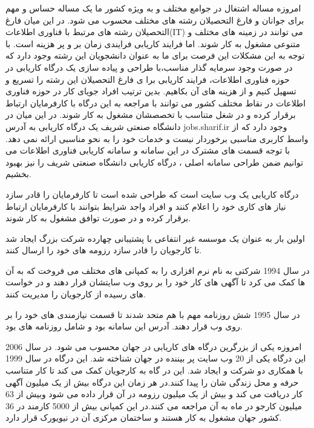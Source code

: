 امروزه مساله اشتغال در جوامع مختلف و به ویژه کشور ما یک مساله حساس و مهم برای جوانان و فارغ التحصیلان رشته های مختلف محسوب می شود. در این میان فارغ التحصیلان رشته های مرتبط با فناوری اطلاعات(IT) می توانند در زمینه های مختلف و متنوعی مشغول به کار شوند. اما فرایند کاریابی فرایندی زمان بر و پر هزینه است. با توجه به این مشکلات این فرصت برای ما به عنوان دانشجویان این رشته وجود دارد که  در صورت وجود سرمایه گذار مناسب،با طراحی و پیاده سازی یک درگاه کاریابی در حوزه فناوری اطلاعات، فرایند کاریابی برا ی فارغ التحصیلان این رشته را تسریع و تسهیل کنیم و از هزینه های آن بکاهیم. بدین ترتیب افراد جویای کار در حوزه فناوری اطلاعات در نقاط مختلف کشور می توانند با مراجعه به این درگاه با کارفرمایان ارتباط برقرار کرده و در شغل متناسب با تخصصشان مشغول به کار شوند. در این میان در دانشگاه صنعتی شریف یک درگاه کاریابی به آدرس jobs.sharif.ir  وجود دارد که از واسط کاربری مناسبی برخوردار نیست و خدمات خود را به نحو مناسبی ارائه نمی دهد. با توجه قسمت های مشترک در این سامانه و سامانه کاریابی فناوری اطلاعات می توانیم ضمن طراحی سامانه اصلی ، درگاه کاریابی دانشگاه صنعتی شریف را نیز بهبود بخشیم.

درگاه کاریابی یک وب سایت است که طراحی شده است تا کارفرمایان را قادر سازد  نیاز های کاری خود را اعلام کنند و افراد واجد شرایط بتوانند با کارفرمایان ارتباط برقرار کرده و در صورت توافق مشغول به کار شوند. 

اولین بار  به عنوان یک موسسه غیر انتفاعی با پشتیبانی چهارده شرکت بزرگ ایجاد شد تا کارجویان را قادر سازد رزومه های خود را ارسال کنند. 

در سال 1994 شرکتی به نام  نرم افزاری را به کمپانی های مختلف می فروخت که به آن ها کمک می کرد تا آگهی های کار خود را بر روی وب سایتشان قرار دهند و در خواست های رسیده از کارجویان را مدیریت کنند.

در سال 1995 شش روزنامه مهم با هم متحد شدند تا قسمت نیازمندی های خود را بر روی وب قرار دهند. آدرس این سامانه  بود و شامل روزنامه های  بود.

امروزه   یکی از بزرگرین درگاه های کاریابی در جهان محسوب می شود. در سال 2006 این درگاه یکی از 20 وب سایت پر بیننده در جهان شناخته شد. این درگاه در سال 1999 با همکاری دو شرکت  و  ایجاد شد. این در گاه به کارجویان کمک می کند تا کار متناسب حرفه و محل زندگی شان را پیدا کنند.در هر زمان این درگاه  بیش از یک میلیون آگهی کار دریافت می کند و بیش از یک میلیون رزومه در آن قرار داده می شود وبیش از 63 میلیون کارجو در ماه به آن مراجعه می کنند.در این کمپانی بیش از 5000 کارمند در 36 کشور جهان مشغول به کار هستند و ساختمان مرکزی آن در نیویورک قرار دارد.

